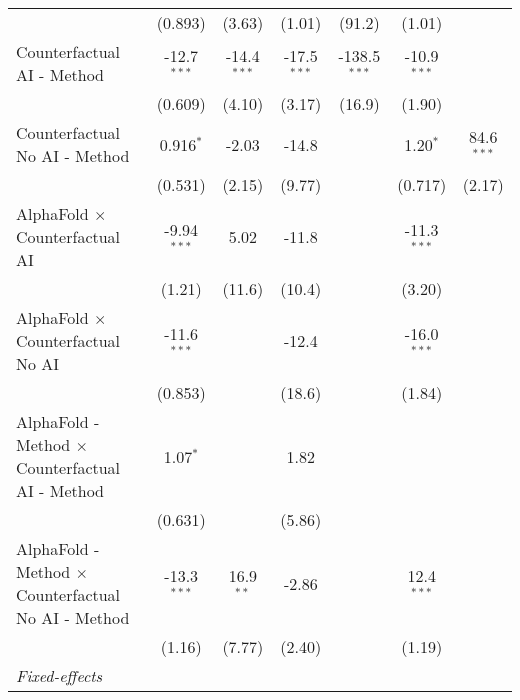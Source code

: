 \begin{tabular}{lcccccc}
                                                              & (0.893)       & (3.63)        & (1.01)        & (91.2)         & (1.01)        &   \\   
   Counterfactual AI - Method                                 & -12.7$^{***}$ & -14.4$^{***}$ & -17.5$^{***}$ & -138.5$^{***}$ & -10.9$^{***}$ &   \\   
                                                              & (0.609)       & (4.10)        & (3.17)        & (16.9)         & (1.90)        &   \\   
   Counterfactual No AI - Method                              & 0.916$^{*}$   & -2.03         & -14.8         &                & 1.20$^{*}$    & 84.6$^{***}$\\   
                                                              & (0.531)       & (2.15)        & (9.77)        &                & (0.717)       & (2.17)\\   
   AlphaFold $\times$ Counterfactual AI                       & -9.94$^{***}$ & 5.02          & -11.8         &                & -11.3$^{***}$ &   \\   
                                                              & (1.21)        & (11.6)        & (10.4)        &                & (3.20)        &   \\   
   AlphaFold $\times$ Counterfactual No AI                    & -11.6$^{***}$ &               & -12.4         &                & -16.0$^{***}$ &   \\   
                                                              & (0.853)       &               & (18.6)        &                & (1.84)        &   \\   
   AlphaFold - Method $\times$ Counterfactual AI - Method     & 1.07$^{*}$    &               & 1.82          &                &               &   \\   
                                                              & (0.631)       &               & (5.86)        &                &               &   \\   
   AlphaFold - Method $\times$ Counterfactual No AI - Method  & -13.3$^{***}$ & 16.9$^{**}$   & -2.86         &                & 12.4$^{***}$  &   \\   
                                                              & (1.16)        & (7.77)        & (2.40)        &                & (1.19)        &   \\   
   \midrule
   \emph{Fixed-effects}\\

\end{tabular}
